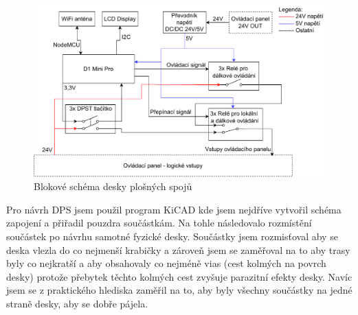 \begin{figure}[H]
    \centering
    \includegraphics[width=1\linewidth]{images/Electrical_Schematic_V2.drawio.pdf}
    \caption{Blokové schéma desky plošných spojů}
    \label{fig:SchemaDesky}
\end{figure}

Pro návrh DPS jsem použil program KiCAD kde jsem nejdříve vytvořil schéma zapojení a přiřadil pouzdra součástkám. Na tohle následovalo rozmístění součástek po návrhu samotné fyzické desky. Součástky jsem rozmisťoval aby se deska vlezla do co nejmenší krabičky a zároveň jsem se zaměřoval na to aby trasy byly co nejkratší a aby obsahovaly co nejméně vias (cest kolmých na povrch desky) protože přebytek těchto kolmých cest zvyšuje parazitní efekty desky. Navíc jsem se z praktického hlediska zaměřil na to, aby byly všechny součástky na jedné straně desky, aby se dobře pájela.

